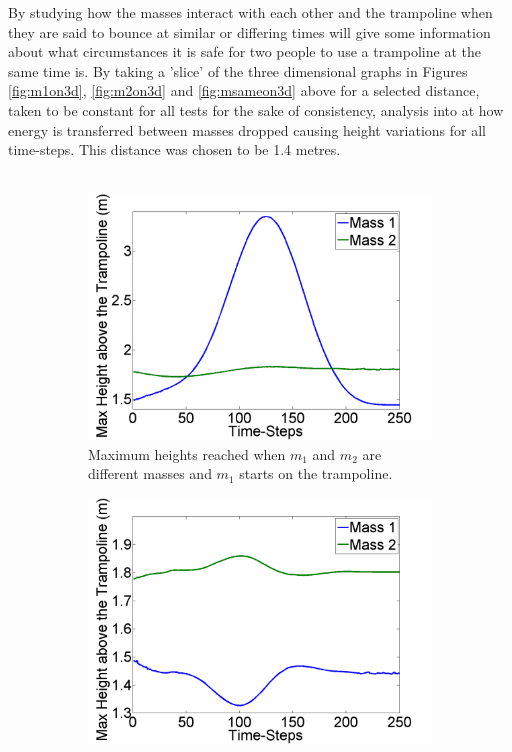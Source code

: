 \noindent By studying how the masses interact with each other and the trampoline when they are said to bounce at similar or differing times will give some information about what circumstances it is safe for two people to use a trampoline at the same time is. By taking a 'slice' of the three dimensional graphs in Figures \ref{fig:m1on3d}, \ref{fig:m2on3d} and \ref{fig:msameon3d} above for a selected distance, taken to be constant for all tests for the sake of consistency, analysis into at how energy is transferred between masses dropped causing height variations for all time-steps. This distance was chosen to be 1.4 metres.%
\\
\\
\begin{figure}[H]
	\centering
    \begin{subfigure}[t]{0.3\textwidth}
		\includegraphics[width=\textwidth]{m1_on_tramp_different_masses_distance_14.png}
    	\caption{Maximum heights reached when $m_1$ and $m_2$ are different masses and $m_1$ starts on the trampoline.}\label{fig:m1_on_tramp_different_masses_distance_14}
    \end{subfigure}\hfill
	\begin{subfigure}[t]{0.3\textwidth}
		\includegraphics[width=\textwidth]{m2_on_tramp_different_masses_distance_14.png}

\end{subfigure}
\end{figure}
